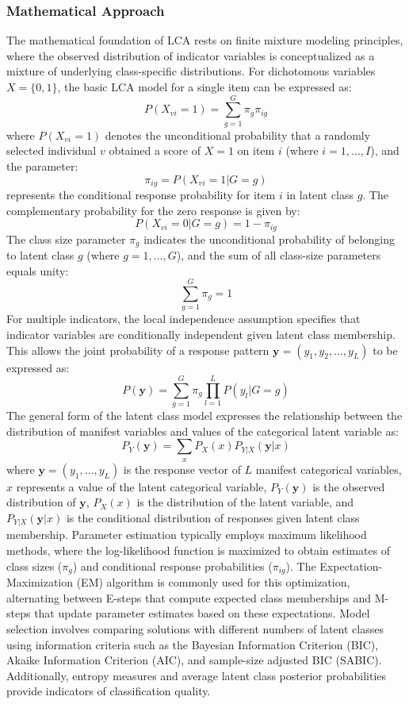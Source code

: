 \documentclass[main.tex]{subfiles}
\begin{document}
\subsubsection{Mathematical Approach}
The mathematical foundation of LCA rests on finite mixture modeling principles, where the observed distribution of indicator variables is conceptualized as a mixture of underlying class-specific distributions. For dichotomous variables $X = \{0,1\}$, the basic LCA model for a single item can be expressed as\parencite{ucla2024}:
$$P(X_{vi} = 1) = \sum_{g=1}^{G} \pi_{g} \pi_{ig}$$
where $P(X_{vi} = 1)$ denotes the unconditional probability that a randomly selected individual $v$ obtained a score of $X = 1$ on item $i$ (where $i = 1, \ldots, I$), and the parameter:
$$\pi_{ig} = P(X_{vi} = 1 | G = g)$$
represents the conditional response probability for item $i$ in latent class $g$\parencite{ucla2024}.
The complementary probability for the zero response is given by:
$$P(X_{vi} = 0 | G = g) = 1 - \pi_{ig}$$
The class size parameter $\pi_g$ indicates the unconditional probability of belonging to latent class $g$ (where $g = 1, \ldots, G$), and the sum of all class-size parameters equals unity:
$$\sum_{g=1}^{G} \pi_{g} = 1$$
For multiple indicators, the local independence assumption specifies that indicator variables are conditionally independent given latent class membership. This allows the joint probability of a response pattern $\mathbf{y} = (y_1, y_2, \ldots, y_L)$ to be expressed as:
$$P(\mathbf{y}) = \sum_{g=1}^{G} \pi_g \prod_{l=1}^{L} P(y_l | G = g)$$
The general form of the latent class model expresses the relationship between the distribution of manifest variables and values of the categorical latent variable as\parencite{statistics2013}:
$$P_Y(\mathbf{y}) = \sum_{x} P_X(x) P_{Y|X}(\mathbf{y}|x)$$
where $\mathbf{y} = (y_1, \ldots, y_L)$ is the response vector of $L$ manifest categorical variables, $x$ represents a value of the latent categorical variable, $P_Y(\mathbf{y})$ is the observed distribution of $\mathbf{y}$, $P_X(x)$ is the distribution of the latent variable, and $P_{Y|X}(\mathbf{y}|x)$ is the conditional distribution of responses given latent class membership\parencite{statistics2013}.
Parameter estimation typically employs maximum likelihood methods, where the log-likelihood function is maximized to obtain estimates of class sizes ($\pi_g$) and conditional response probabilities ($\pi_{ig}$). The Expectation-Maximization (EM) algorithm is commonly used for this optimization, alternating between E-steps that compute expected class memberships and M-steps that update parameter estimates based on these expectations\parencite{collins2021}.
Model selection involves comparing solutions with different numbers of latent classes using information criteria such as the Bayesian Information Criterion (BIC), Akaike Information Criterion (AIC), and sample-size adjusted BIC (SABIC). Additionally, entropy measures and average latent class posterior probabilities provide indicators of classification quality\parencite{masyn2020}.
\end{document}
